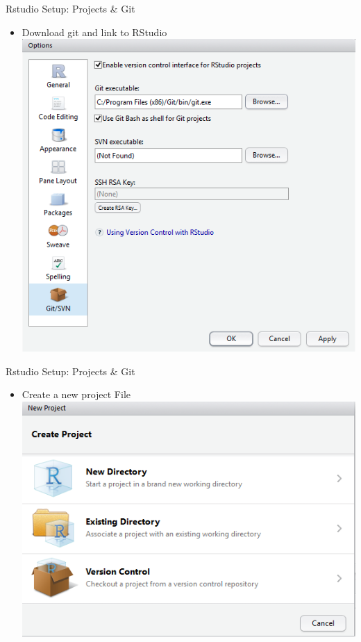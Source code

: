 \documentclass[
  ignorenonframetext,
]{beamer}
\providecommand{\tightlist}{%
  \setlength{\itemsep}{0pt}\setlength{\parskip}{0pt}}
\begin{document}
\begin{frame}{Rstudio Setup: Projects \& Git}
\protect\hypertarget{rstudio-setup-projects-git}{}

\begin{itemize}[<+->]
\tightlist
\item
  Download git and link to RStudio
  \includegraphics{../external/images/rstudio_setup_git.PNG}
\end{itemize}

\end{frame}

\begin{frame}{Rstudio Setup: Projects \& Git}
\protect\hypertarget{rstudio-setup-projects-git-1}{}

\begin{itemize}[<+->]
\tightlist
\item
  Create a new project File
  \includegraphics{../external/images/rstudio_setup_project.PNG}
\end{itemize}

\end{frame}
\end{document}
